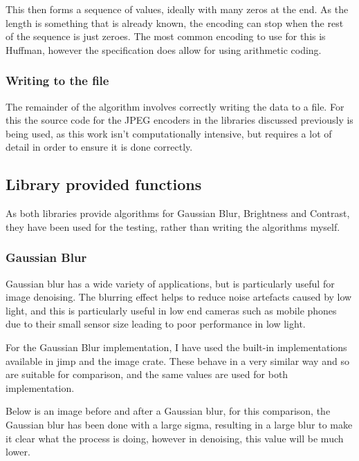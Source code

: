 \documentclass[12pt,a4paper]{article}
\begin{document}
This then forms a sequence of values, ideally with many zeros at the end. As the length is something that is already known, the encoding can stop when the rest of the sequence is just zeroes. The most common encoding to use for this is Huffman, however the specification does allow for using arithmetic coding.

\subsubsection{Writing to the file}

The remainder of the algorithm involves correctly writing the data to a file. For this the source code for the JPEG encoders in the libraries discussed previously is being used, as this work isn't computationally intensive, but requires a lot of detail in order to ensure it is done correctly.

\subsection{Library provided functions}

As both libraries provide algorithms for Gaussian Blur, Brightness and Contrast, they have been used for the testing, rather than writing the algorithms myself.

\subsubsection{Gaussian Blur}

Gaussian blur has a wide variety of applications, but is particularly useful for image denoising. The blurring effect helps to reduce noise artefacts caused by low light, and this is particularly useful in low end cameras such as mobile phones due to their small sensor size leading to poor performance in low light.


For the Gaussian Blur implementation, I have used the built-in implementations available in jimp and the image crate. These behave in a very similar way and so are suitable for comparison, and the same values are used for both implementation.

Below is an image before and after a Gaussian blur, for this comparison, the Gaussian blur has been done with a large sigma, resulting in a large blur to make it clear what the process is doing, however in denoising, this value will be much lower.
\end{document}
